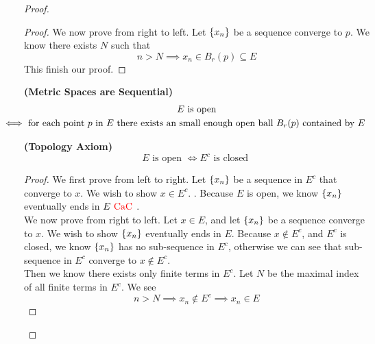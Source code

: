 \documentclass{report}
\begin{document}
\begin{proof}
\begin{proof}
We now prove from right to left. Let $\{ x_n \}$ be a sequence converge to $p$. We know there exists $N$ such that
\begin{equation}
n>N\implies x_n\in B_r(p)\subseteq E
\end{equation}
This finish our proof.
\end{proof}
\begin{corollary}
\label{1.3.11}
\textbf{(Metric Spaces are Sequential)} 
\begin{gather}
\text{ $E$ is open  }\\
\liff \text{ for each point  $p$ in  $E$ there exists an small enough open ball $B_r(p)$ contained by $E$ }
\end{gather}
\end{corollary}
\begin{theorem}
\label{1.3.12}
\textbf{(Topology Axiom)}
\begin{equation}
E\text{ is open  }\iff E^c\text{ is closed }
\end{equation}
\end{theorem}
\begin{proof}
We first prove from left to right. Let $\{ x_n \}$ be a sequence in $E^c$ that converge to $x$. We wish to show  $x\in E^c$. . Because $E$ is open, we know $\{ x_n \}$ eventually ends in $E\text{ \textcolor{red}{CaC} }$.\\

We now prove from right to left. Let $x\in E$, and let $\{ x_n \}$ be a sequence converge to $x$. We wish to show  $\{ x_n \}$ eventually ends in $E$. Because  $x\not \in E^c$, and $E^c$ is closed, we know  $\{ x_n \}$ has no sub-sequence in  $E^c$, otherwise we can see that sub-sequence in $E^c$ converge to  $x\not\in E^c$.\\

Then we know there exists only finite terms in $E^c$. Let $N$ be the maximal index of all finite terms in  $E^c$. We see
 \begin{equation}
n>N\implies x_n\not\in E^c\implies x_n\in E
\end{equation}
\end{proof}

\end{proof}
\end{document}
